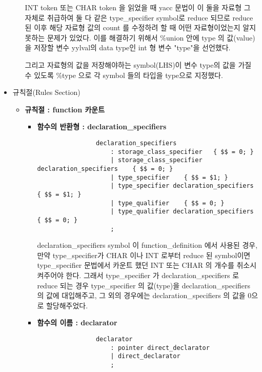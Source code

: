 \documentclass{article}
\begin{document}
\begin{itemize}
\begin{itemize}
		\vspace{3mm}
		INT token 또는 CHAR token 을 읽었을 때 yacc 문법이 이 둘을 자료형 그 자체로 취급하여
		둘 다 같은 type\_specifier symbol로 reduce 되므로 reduce 된 이후 해당 자료형 값의 count 를 수정하려 할 때
		어떤 자료형이었는지 알지 못하는 문제가 있었다. 이를 해결하기 위해서 \%union 안에 type 의 값(value)을 저장할
		변수 yylval의 data type인 int 형 변수 "type"을 선언했다.

		\vspace{3mm}
		그리고 자료형의 값을 저장해야하는 symbol(LHS)이 변수 type의 값을 가질 수 있도록 \%type 으로 각 symbol 들의
		타입을 type으로 지정했다.
	\end{itemize}

	\item 규칙절(Rules Section)	
	\begin{itemize}
		\item {\bf 규칙절 : function 카운트}
		\begin{itemize}
			\item {\bf 함수의 반환형 : declaration\_specifiers}
			\begin{lstlisting}
				declaration_specifiers
					: storage_class_specifier	{ $$ = 0; }
					| storage_class_specifier declaration_specifiers	{ $$ = 0; }
					| type_specifier	{ $$ = $1; }
					| type_specifier declaration_specifiers	{ $$ = $1; }
					| type_qualifier	{ $$ = 0; }
					| type_qualifier declaration_specifiers	{ $$ = 0; }
					;
			\end{lstlisting}
			declaration\_specifiers symbol 이 function\_definition 에서 사용된 경우,
			만약 type\_specifier가 CHAR 이나 INT 로부터 reduce 된 symbol이면 type\_specifier
			문법에서 카운트 했던 INT 또는 CHAR 의 개수를 취소시켜주어야 한다. 그래서 type\_specifier 가
			declaration\_specifiers 로 reduce 되는 경우 type\_specifier 의 값(type)을
			declaration\_specifiers 의 값에 대입해주고, 그 외의 경우에는 declaration\_specifiers 의 값을
			0으로 할당해주었다.

			\item {\bf 함수의 이름 : declarator}
			\begin{lstlisting}
				declarator
					: pointer direct_declarator
					| direct_declarator
					;


\end{lstlisting}
\end{itemize}
\end{itemize}
\end{itemize}
\end{document}
